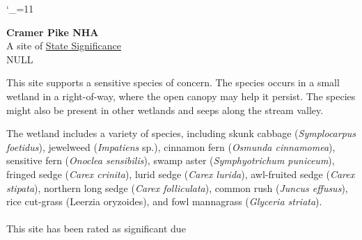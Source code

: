 \documentclass{article}\usepackage[]{graphicx}\usepackage[]{color}
\begin{document}
\catcode`\_=11

\noindent
\textbf{\LARGE{Cramer Pike NHA}}\\
\large A site of \underline{State Significance} \
\medskip \\

NULL




\normalsize
\noindent
This site supports a sensitive species of concern. The species occurs in a small wetland in a right-of-way, where the open canopy may help it persist.  The species might also be present in other wetlands and seeps along the stream valley. \\ \par\noindent The wetland includes a variety of species, including skunk cabbage (\textit{\textit{Symplocarpus} foetidus}), jewelweed (\textit{Impatiens} sp.), cinnamon fern (\textit{\textit{Osmunda} cinnamomea}), sensitive fern (\textit{\textit{Onoclea} sensibilis}), swamp aster (\textit{\textit{Symphyotrichum} puniceum}), fringed sedge (\textit{\textit{Carex} crinita}), lurid sedge (\textit{\textit{Carex} lurida}), awl-fruited sedge (\textit{\textit{Carex} stipata}), northern long sedge (\textit{\textit{Carex} folliculata}), common rush (\textit{\textit{Juncus} effusus}), rice cut-grass (Leerzia oryzoides), and fowl mannagrass (\textit{\textit{Glyceria} striata}).\\\\
This site has been rated as  significant due 
\end{document}
